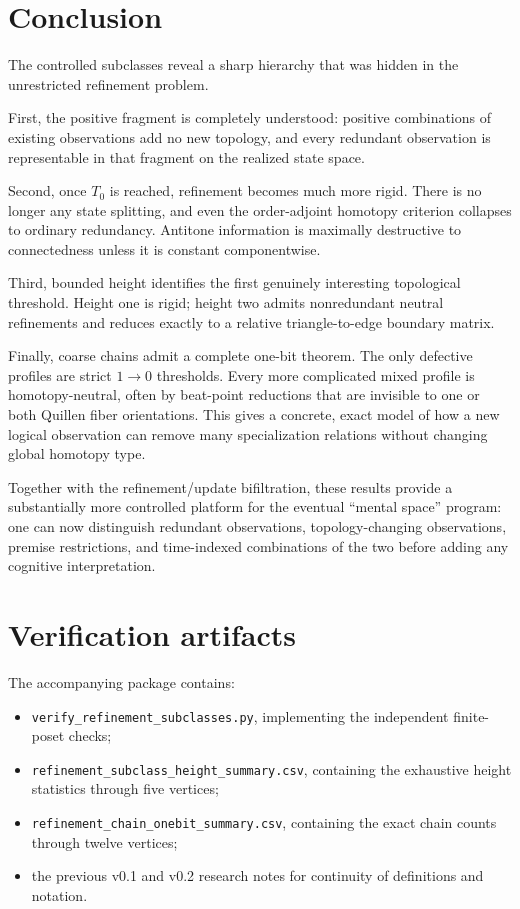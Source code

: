 \documentclass[11pt]{article}
\theoremstyle{definition}
\begin{document}
\section{Conclusion}

The controlled subclasses reveal a sharp hierarchy that was hidden in the unrestricted refinement problem.

First, the positive fragment is completely understood: positive combinations of existing observations add no new topology, and every redundant observation is representable in that fragment on the realized state space.

Second, once $T_0$ is reached, refinement becomes much more rigid. There is no longer any state splitting, and even the order-adjoint homotopy criterion collapses to ordinary redundancy. Antitone information is maximally destructive to connectedness unless it is constant componentwise.

Third, bounded height identifies the first genuinely interesting topological threshold. Height one is rigid; height two admits nonredundant neutral refinements and reduces exactly to a relative triangle-to-edge boundary matrix.

Finally, coarse chains admit a complete one-bit theorem. The only defective profiles are strict $1\to0$ thresholds. Every more complicated mixed profile is homotopy-neutral, often by beat-point reductions that are invisible to one or both Quillen fiber orientations. This gives a concrete, exact model of how a new logical observation can remove many specialization relations without changing global homotopy type.

Together with the refinement/update bifiltration, these results provide a substantially more controlled platform for the eventual ``mental space'' program: one can now distinguish redundant observations, topology-changing observations, premise restrictions, and time-indexed combinations of the two before adding any cognitive interpretation.

\appendix
\section{Verification artifacts}

The accompanying package contains:
\begin{itemize}
\item \texttt{verify\_refinement\_subclasses.py}, implementing the independent finite-poset checks;
\item \texttt{refinement\_subclass\_height\_summary.csv}, containing the exhaustive height statistics through five vertices;
\item \texttt{refinement\_chain\_onebit\_summary.csv}, containing the exact chain counts through twelve vertices;
\item the previous v0.1 and v0.2 research notes for continuity of definitions and notation.
\end{itemize}
\end{document}
